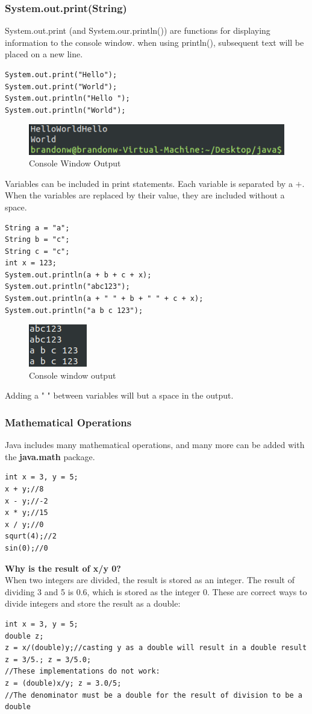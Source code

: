 \documentclass{article}
\begin{document}
\subsubsection{System.out.print(String)}
System.out.print (and System.our.println()) are functions for displaying information to the console window. when using println(), subsequent text will be placed on a new line.
\begin{lstlisting}
System.out.print("Hello");
System.out.print("World");
System.out.println("Hello ");
System.out.println("World");
\end{lstlisting}
\begin{figure}[h]
	\centering
	\includegraphics{consolewindowprint1}
	\caption{Console Window Output}
\end{figure}
Variables can be included in print statements. Each variable is separated by a $+$. When the variables are replaced by their value, they are included without a space.
\begin{lstlisting}
String a = "a";
String b = "c";
String c = "c";
int x = 123;
System.out.println(a + b + c + x);
System.out.println("abc123");
System.out.println(a + " " + b + " " + c + x);
System.out.println("a b c 123");
\end{lstlisting}
\begin{figure}[h]
	\centering
	\includegraphics{consolewindowprint2}
	\caption{Console window output}
\end{figure}
Adding a " " between variables will but a space in the output.

\subsubsection{Mathematical Operations}
Java includes many mathematical operations, and many more can be added with the 
\textbf{java.math} package. 
\begin{lstlisting}
int x = 3, y = 5;
x + y;//8
x - y;//-2
x * y;//15
x / y;//0
squrt(4);//2
sin(0);//0
\end{lstlisting}
\textbf{Why is the result of x/y 0?}\\
When two integers are divided, the result is stored as an integer. The result of dividing 3 and 5 is 0.6, which is stored as the integer 0. These are correct ways to divide integers and store the result as a double:
\begin{lstlisting}
int x = 3, y = 5;
double z;
z = x/(double)y;//casting y as a double will result in a double result
z = 3/5.; z = 3/5.0;
//These implementations do not work:
z = (double)x/y; z = 3.0/5;
//The denominator must be a double for the result of division to be a double
\end{lstlisting}
\end{document}
